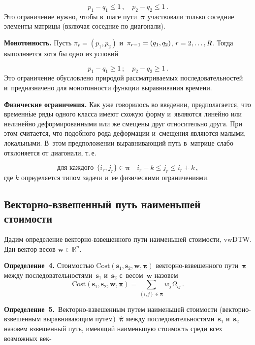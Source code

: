 \begin{multicols}{2}
\begin{description}
 \noindent
 $$
 p_1-q_1\leq1\,,\quad p_2-q_2\leq 1\,.
 $$ 
 Это ограничение нужно, чтобы в~шаге пути~$\boldsymbol{\pi}$ участвовали только 
 соседние элементы матрицы (включая соседние по диагонали).

\item[\,] \textbf{Монотонность.}
 Пусть ${\pi}_r = (p_1,p_2)$ и~${\pi}_{r-1}\hm = (q_1,q_2)$, $r \hm= 2,\ldots,R$. 
 Тогда выполняется хотя бы одно из условий 
 
 \noindent
 $$
 p_1-q_1\geq1\,;\quad p_2-q_2\geq1\,.
 $$
 Это ограничение обусловлено природой рассматриваемых последовательностей 
 и~предназначено для монотонности функции выравнивания времени.

\item[\,] \textbf{Физические ограничения.}
Как уже говорилось во введении, предполагается, что временн$\acute{\mbox{ы}}$е ряды 
одного класса имеют схожую форму и~являются линейно или нелинейно 
деформированными или же смещены друг относительно друга. При этом считается, 
что подобного рода деформации и~смещения являются малыми, локальными. 
В~этом предположении выравнивающий путь в~матрице слабо отклоняется от диагонали,
т.\,е.\

\noindent
$$ \mbox{для каждого} \ \  
\{i_r,j_r\} \in \boldsymbol{\pi} \quad i_r - k\leq j_r\leq i_r + k\,,
$$
где $k$ определяется типом задачи и~ее физическими ограничениями.
\end{description}


\subsection{Векторно-взвешенный путь наименьшей стоимости}

Дадим определение век\-тор\-но-взве\-шен\-но\-го пути наименьшей стоимости, vwDTW. 
Дан вектор весов $\mathbf{w} \in \mathbb{R}^{n}$.

\smallskip

\noindent
\textbf{Определение~4.} 
Стоимостью $\mathrm{Cost}(\mathbf{s}_1,\mathbf{s}_2,\mathbf{w},{\boldsymbol{\pi}})$ 
век\-тор\-но-взве\-шен\-но\-го пути~$\boldsymbol{\pi}$ между 
последовательностями~$\mathbf{s}_1$ 
и~$\mathbf{s}_2$ с~весом~$\mathbf{w}$ назовем
\begin{equation*}
\mathrm{Cost}\left(\mathbf{s}_1,\mathbf{s}_2,\mathbf{w},{\boldsymbol{\pi}}\right) 
= \sum\limits_{(i,j) \in \boldsymbol{\pi}}w_j{\Omega}_{ij}\,.
\end{equation*}

\noindent
\textbf{Определение~5.}\
Век\-тор\-но-взве\-шен\-ным путем наименьшей стоимости (век\-тор\-но-взве\-шен\-ным 
выравнивающим путем)~$\hat{\boldsymbol{\pi}}$ между последовательностями~$\mathbf{s}_1$ 
и~$\mathbf{s}_2$ назовем взвешенный путь, имеющий наименьшую стоимость среди 
всех возможных век-\linebreak 


\end{multicols}
